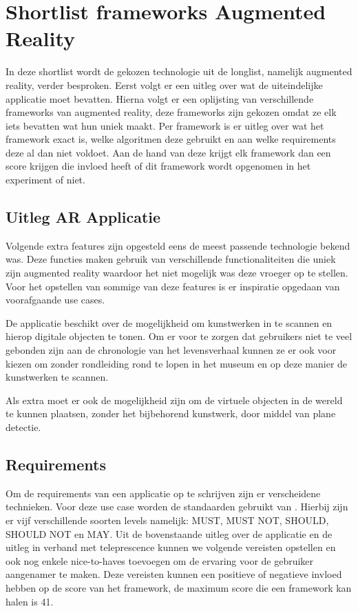 \chapter{Shortlist frameworks Augmented Reality}
\label{ch:shortlist}

In deze shortlist wordt de gekozen technologie uit de longlist, namelijk augmented reality, verder besproken.
Eerst volgt er een uitleg over wat de uiteindelijke applicatie moet bevatten.
Hierna volgt er een oplijsting van verschillende frameworks van augmented reality, deze frameworks zijn gekozen omdat ze elk iets bevatten wat hun uniek maakt. Per framework is er uitleg over wat het framework exact is, welke algoritmen deze gebruikt en aan welke requirements deze al dan niet voldoet. Aan de hand van deze krijgt elk framework dan een score krijgen die invloed heeft of dit framework wordt opgenomen in het experiment of niet.

\section{Uitleg AR Applicatie}\label{sec:arrequirements}
Volgende extra features zijn opgesteld eens de meest passende technologie bekend was. Deze functies maken gebruik van verschillende functionaliteiten die uniek zijn augmented reality waardoor het niet mogelijk was deze vroeger op te stellen.  Voor het opstellen van sommige van deze features is er inspiratie opgedaan van voorafgaande use cases.

De applicatie beschikt over de mogelijkheid om kunstwerken in te scannen en hierop digitale objecten te tonen. 
Om er voor te zorgen dat gebruikers niet te veel gebonden zijn aan de chronologie van het levensverhaal kunnen ze er ook voor kiezen om zonder rondleiding rond te lopen in het museum en op deze manier de kunstwerken te scannen.

Als extra moet er ook de mogelijkheid zijn om de virtuele objecten in de wereld te kunnen plaatsen, zonder het bijbehorend kunstwerk, door middel van plane detectie.

\section{Requirements}
Om de requirements van een applicatie op te schrijven zijn er verscheidene technieken. Voor deze use case worden de standaarden gebruikt van \textcite{Bradner1997}. Hierbij zijn er vijf verschillende soorten levels namelijk: MUST, MUST NOT, SHOULD, SHOULD NOT en MAY. Uit de bovenstaande uitleg over de applicatie en de uitleg in verband met teleprescence kunnen we volgende vereisten opstellen en ook nog enkele nice-to-haves toevoegen om de ervaring voor de gebruiker aangenamer te maken. Deze vereisten kunnen een positieve of negatieve invloed hebben op de score van het framework, de maximum score die een framework kan halen is 41.

